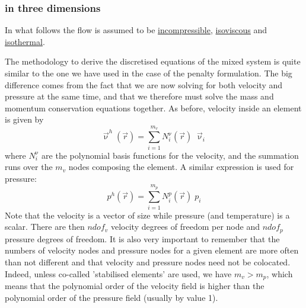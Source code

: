 
\subsubsection{in three dimensions}

In what follows the flow is assumed to be \underline{incompressible}, 
\underline{isoviscous} and \underline{isothermal}. 

The methodology to derive the discretised equations of the mixed system is 
quite similar to the one we have used in the case of the penalty formulation.
The big difference comes from the fact that we are now solving for both 
velocity and pressure at the same time, and that we therefore must solve 
the mass and momentum conservation equations together.
As before, velocity inside an element is given by 
\begin{equation}
{\vec \upnu}^h({\vec r})=\sum_{i=1}^{m_v} N_i^\upnu({\vec r})\;  {\vec \upnu}_i
\label{mixed01}
\end{equation}
where $N_i^{\upnu}$ are the polynomial basis functions for the velocity,
and the summation runs over the $m_v$ nodes composing the element.
A similar expression is used for pressure:
\begin{equation}
p^h({\vec r})=\sum_{i=1}^{m_p} N_i^p({\vec r}) \; p_i
\label{mixed02}
\end{equation}
Note that the velocity is a vector of size while pressure (and temperature)
is a scalar. There are then $ndof_v$ velocity degrees of freedom per node
and $ndof_p$ pressure degrees of freedom.
It is also very important to remember that the numbers of 
velocity nodes and pressure nodes for a given element 
are more often than not different and that velocity and pressure
nodes need not be colocated. Indeed, unless 
co-called 'stabilised elements' are used, we have $m_v>m_p$, which 
means that the polynomial order of the velocity field is higher than 
the polynomial order of the pressure field (usually by value 1).


